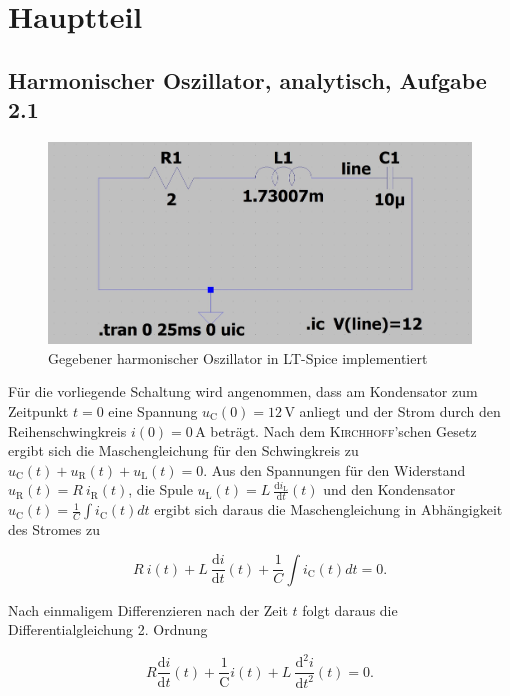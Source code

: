 
\chapter*{Hauptteil}
	\section*{Harmonischer Oszillator, analytisch, Aufgabe 2.1}\label{sec:ag2.1}
	\begin{figure}[h]
		\centering
		\includegraphics[width=\textwidth]{data/harmOsz}
		\caption{Gegebener harmonischer Oszillator in LT-Spice implementiert}
		\label{oszillator}
	\end{figure}
	Für die vorliegende Schaltung wird angenommen, dass am Kondensator zum Zeitpunkt $t = 0$ eine Spannung $u_\mathrm{C}(0) = 12\,$V anliegt und der Strom durch den Reihenschwingkreis $i(0) = 0\,$A beträgt. Nach dem \textsc{Kirchhoff}'schen Gesetz ergibt sich die Maschengleichung für den Schwingkreis zu $u_\mathrm{C}(t) + u_\mathrm{R}(t) + u_\mathrm{L}(t) = 0$. Aus den Spannungen für den Widerstand $u_\mathrm{R}(t) = R \: i_\mathrm{R}(t)$, die Spule $u_\mathrm{L}(t) = L\: \frac{\mathrm{d}i_\mathrm{L}}{\mathrm{d}t}(t)$ und den Kondensator $u_\mathrm{C}(t) = \frac{1}{C} \int i_\mathrm{C}(t)dt $ ergibt sich daraus die Maschengleichung in Abhängigkeit des Stromes zu 
	
	\begin{equation*}
		R\:i(t) + L\: \frac{\mathrm{d}i}{\mathrm{d}t}(t) + \frac{1}{C} \int i_\mathrm{C}(t)dt = 0.
	\end{equation*}
	
	Nach einmaligem Differenzieren nach der Zeit $t$ folgt daraus die Differentialgleichung 2. Ordnung 
	
	\begin{equation}
		R  \frac{\mathrm{d}i}{\mathrm{d}t}(t) + \frac{1}{\mathrm{C}} i(t) +  L\: \frac{\mathrm{d^2}i}{\mathrm{d}t^2}(t) = 0.
		\label{eq:it1}
	\end{equation}
	

